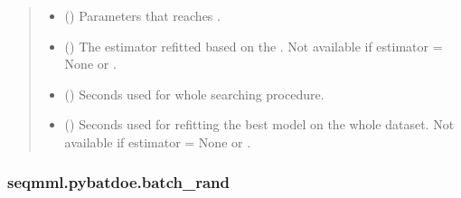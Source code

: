 \documentclass[letterpaper,10pt,english]{sphinxmanual}
\begin{document}
\begin{fulllineitems}
\begin{quote}
\begin{description}
\begin{itemize}
\item {} 
 () \textendash{} Parameters that reaches .

\item {} 
 () \textendash{} The estimator refitted based on the . 
Not available if estimator = None or .

\item {} 
 () \textendash{} Seconds used for whole searching procedure.

\item {} 
 () \textendash{} Seconds used for refitting the best model on the whole dataset.
Not available if estimator = None or .

\end{itemize}

\end{description}\end{quote}

\end{fulllineitems}



\subsubsection{seqmml.pybatdoe.batch\_rand}
\label{\detokenize{apidoc:module-pybatdoe.batch_rand}}\label{\detokenize{apidoc:seqmml-pybatdoe-batch-rand}}
\end{document}
